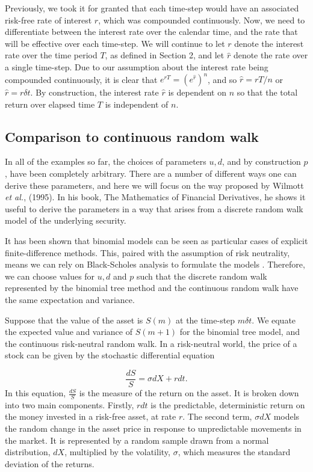 \documentclass[letterpaper,12pt]{article}
\theoremstyle{plain}
\numberwithin{equation}{section}
\begin{document}
Previously, we took it for granted that each time-step would have an associated risk-free rate of interest $r$, which was compounded continuously. Now, we need to differentiate between the interest rate over the calendar time, and the rate that will be effective over each time-step. We will continue to let $r$ denote the interest rate over the time period $T$, as defined in Section 2, and let $\hat{r}$ denote the rate over a single time-step. Due to our assumption about the interest rate being compounded continuously, it is clear that $e^{rT} = (e^{\hat{r}})^n$, and so $\hat{r} = rT/n$ or $\hat{r} = r\delta t$. By construction, the interest rate $\hat{r}$ is dependent on $n$ so that the total return over elapsed time $T$ is independent of $n$.

\subsection{Comparison to continuous random walk}
In all of the examples so far, the choices of parameters $u, d$, and by construction $p$, have been completely arbitrary. There are a number of different ways one can derive these parameters, and here we will focus on the way proposed by Wilmott {\em et al.}, (1995). In his book, The Mathematics of Financial Derivatives, he shows it useful to derive the parameters in a way that arises from a discrete random walk model of the underlying security. 

It has been shown that binomial models can be seen as particular cases of explicit finite-difference methods. This, paired with the assumption of risk neutrality, means we can rely on Black-Scholes analysis to formulate the models \cite{MFD}. Therefore, we can choose values for $u, d$ and $p$ such that the discrete random walk represented by the binomial tree method and the continuous random walk have the same expectation and variance.



Suppose that the value of the asset is $S(m)$ at the time-step $m\delta t$. We equate the expected value and variance of $S(m+1)$ for the binomial tree model, and the continuous risk-neutral random walk. In a risk-neutral world, the price of a stock can be given by the stochastic differential equation

\begin{equation}
	\frac{dS}{S} = \sigma dX + rdt.
\end{equation}
In this equation, $\frac{dS}{S}$ is the measure of the return on the asset. It is broken down into two main components. Firstly, $rdt$ is the predictable, deterministic return on the money invested in a risk-free asset, at rate $r$. The second term, $\sigma dX$ models the random change in the asset price in response to unpredictable movements in the market. It is represented by a random sample drawn from a normal distribution, $dX$, multiplied by the volatility, $\sigma$, which measures the standard deviation of the returns.
\end{document}
